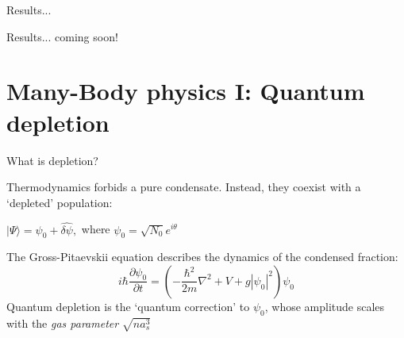 \documentclass{beamer}
\begin{document}



 



\begin{frame}{Results...}

\end{frame}

\begin{frame}{Results... coming soon!}

\end{frame}

\section{Many-Body physics I: Quantum depletion}

\begin{frame}{What is depletion?}

Thermodynamics forbids a pure condensate. Instead, they coexist with a `depleted' population:
\begin{center}
        $|\Psi\rangle = \psi_0  + \hat{\delta\psi},$ where $\psi_0 = \sqrt{N_0}e^{i\theta}$    
\end{center}
The Gross-Pitaevskii equation describes the dynamics of the condensed fraction:
        $$
            i\hbar\frac{\partial\psi_0}{\partial t} = \left(-\frac{\hbar^2}{2m}\nabla^2+V+g|\psi_0|^2\right)\psi_0
        $$
Quantum depletion is the `quantum correction' to $\psi_0$, whose amplitude scales with the \textit{gas parameter} $\sqrt{n a_{s}^3}$

\end{frame}
\end{document}

